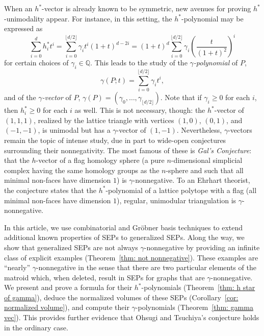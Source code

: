 \documentclass{amsart}
\numberwithin{equation}{section}
\theoremstyle{plain}
\theoremstyle{definition}
\newcommand{\QQ}{\mathbb{Q}}
\begin{document}
    When an $h^*$-vector is already known to be symmetric, new avenues for proving $h^*$-unimodality appear.
    For instance, in this setting, the $h^*$-polynomial may be expressed as
    \begin{equation}\label{eq: hstar gamma equivalence}
        \sum_{i=0}^d h^*_it^i = \sum_{i=0}^{\lfloor d/2 \rfloor} \gamma_it^i(1+t)^{d-2i} = (1+t)^d \sum_{i=0}^{\lfloor d/2 \rfloor} \gamma_i \left( \frac{t}{(1+t)^2}\right)^i
    \end{equation}
    for certain choices of $\gamma_i \in \QQ$.
    This leads to the study of the \emph{$\gamma$-polynomial} of $P$,
    \[
        \gamma(P;t) = \sum_{i=0}^{\lfloor d/2 \rfloor} \gamma_it^i,
    \]
    and of the \emph{$\gamma$-vector} of $P$, $\gamma(P) = (\gamma_0,\dots,\gamma_{\lfloor d/2 \rfloor})$.
    Note that if $\gamma_i \geq 0$ for each $i$, then $h^*_i \geq 0$ for each $i$ as well.
    This is not necessary, though: the $h^*$-vector of $(1,1,1)$, realized by the lattice triangle with vertices $(1,0)$, $(0,1)$, and $(-1,-1)$, is unimodal but has a $\gamma$-vector of $(1,-1)$.
    Nevertheless, $\gamma$-vectors remain the topic of intense study, due in part to wide-open conjectures surrounding their nonnegativity.
    The most famous of these is \emph{Gal's Conjecture}: that the $h$-vector of a flag homology sphere (a pure $n$-dimensional simplicial complex having the same homology groups as the $n$-sphere and
    such that all minimal non-faces have dimension $1$) is $\gamma$-nonnegative. 
    To an Ehrhart theorist, the conjecture states that the $h^*$-polynomial of a lattice polytope with a  flag (all minimal non-faces have dimension $1$), regular, unimodular triangulation is $\gamma$-nonnegative.
    
    In this article, we use combinatorial and Gr\"obner basis techniques to extend additional known properties of SEPs to generalized SEPs.
    Along the way, we show that generalized SEPs are not always $\gamma$-nonnegative by providing an infinite class of explicit examples (Theorem~\ref{thm: not nonnegative}).
    These examples are ``nearly'' $\gamma$-nonnegative in the sense that there are two particular elements of the matroid which, when deleted, result in SEPs for graphs that are $\gamma$-nonnegative.
    We present and prove a formula for their $h^*$-polynomials (Theorem~\ref{thm: h star of gamma}), deduce the normalized volumes of these SEPs (Corollary~\ref{cor: normalized volume}), and compute their $\gamma$-polynomials (Theorem~\ref{thm: gamma vec}).
    This provides further evidence that Ohsugi and Tsuchiya's conjecture holds in the ordinary case.
\end{document}
